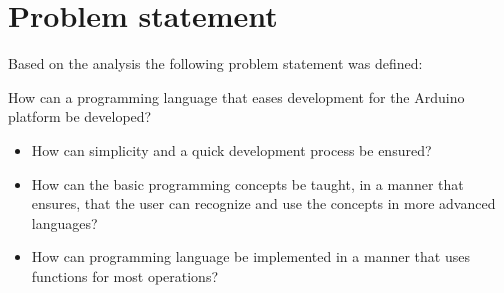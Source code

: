 \section{Problem statement}
Based on the analysis the following problem statement was defined:
\begin{center}
	How can a programming language that eases development for the Arduino platform be developed?

\begin{itemize}
	\item How can simplicity and a quick development process be ensured?
	\item How can the basic programming concepts be taught, in a manner that ensures, that the user can recognize and use the concepts in more advanced languages?
	\item How can programming language be implemented in a manner that uses functions for most operations? 
\end{itemize}
\end{center}
